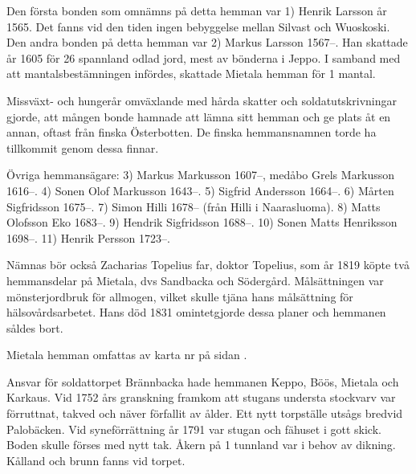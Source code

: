 %

Den första bonden som omnämns på detta hemman var 1) Henrik Larsson år 1565. Det fanns vid den tiden ingen bebyggelse mellan Silvast och Wuoskoski. Den andra bonden på detta hemman var 2) Markus Larsson 1567--. Han skattade år 1605 för 26 spannland odlad jord, mest av bönderna i Jeppo. I samband med att mantalsbestämningen infördes, skattade Mietala hemman för 1 mantal.

Missväxt- och hungerår omväxlande med hårda skatter och soldatutskrivningar gjorde, att mången bonde hamnade att lämna sitt hemman och ge plats åt en annan, oftast från finska Österbotten. De finska hemmansnamnen torde ha tillkommit genom dessa finnar.

Övriga hemmansägare:  3) Markus Markusson 1607--, medåbo Grels Markusson 1616--. 4) Sonen Olof Markusson 1643--. 5) Sigfrid Andersson 1664--. 6) Mårten Sigfridsson 1675--. 7) Simon Hilli 1678-- (från Hilli i Naarasluoma). 8) Matts Olofsson Eko 1683--. 9) Hendrik Sigfridsson 1688--. 10) Sonen Matts Henriksson 1698--. 11) Henrik Persson 1723--.

Nämnas bör också  Zacharias Topelius far, doktor Topelius, som år 1819 köpte två hemmansdelar på Mietala, dvs Sandbacka och Södergård. Målsättningen var mönsterjordbruk för allmogen, vilket skulle tjäna hans målsättning för hälsovårdsarbetet. Hans död 1831 omintetgjorde dessa planer och hemmanen såldes bort.


Mietala hemman omfattas av karta nr  på sidan \pageref{map:14}.




%



%

\jhnooccupant{}

Ansvar för soldattorpet Brännbacka hade hemmanen Keppo, Böös, Mietala och Karkaus. Vid 1752 års granskning framkom att stugans understa stockvarv var förruttnat, takved och näver förfallit av ålder. Ett nytt torpställe utsågs bredvid Palobäcken. Vid syneförrättning år 1791 var stugan och fähuset i gott skick. Boden skulle förses med nytt tak. Åkern på 1 tunnland var i behov av dikning. Kålland och brunn fanns vid torpet.

